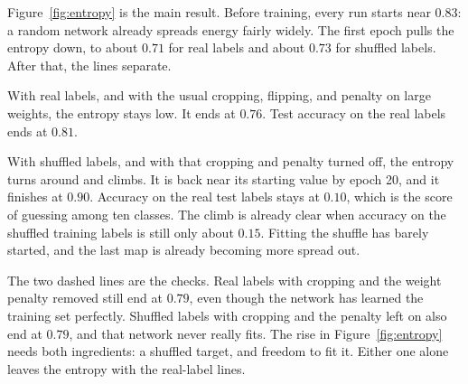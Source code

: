 \documentclass[11pt,a4paper]{article}
\begin{document}
Figure~\ref{fig:entropy} is the main result. Before training, every run starts near \(0.83\): a random network already spreads energy fairly widely. The first epoch pulls the entropy down, to about \(0.71\) for real labels and about \(0.73\) for shuffled labels. After that, the lines separate.

With real labels, and with the usual cropping, flipping, and penalty on large weights, the entropy stays low. It ends at \(0.76\). Test accuracy on the real labels ends at \(0.81\).

With shuffled labels, and with that cropping and penalty turned off, the entropy turns around and climbs. It is back near its starting value by epoch 20, and it finishes at \(0.90\). Accuracy on the real test labels stays at \(0.10\), which is the score of guessing among ten classes. The climb is already clear when accuracy on the shuffled training labels is still only about \(0.15\). Fitting the shuffle has barely started, and the last map is already becoming more spread out.

The two dashed lines are the checks. Real labels with cropping and the weight penalty removed still end at \(0.79\), even though the network has learned the training set perfectly. Shuffled labels with cropping and the penalty left on also end at \(0.79\), and that network never really fits. The rise in Figure~\ref{fig:entropy} needs both ingredients: a shuffled target, and freedom to fit it. Either one alone leaves the entropy with the real-label lines.
\end{document}
